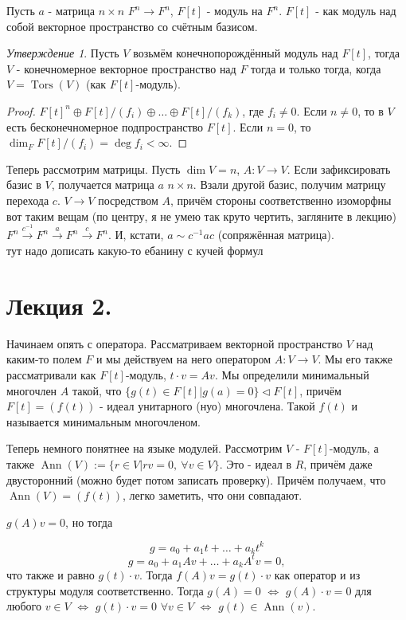 \documentclass[a4paper,100pt]{article}
\theoremstyle{indented}
\theoremstyle{definition}
\theoremstyle{remark}
\newtheorem{stat}{Утверждение}
\DeclareMathOperator{\Tors}{Tors}
\DeclareMathOperator{\Ann}{Ann}
\begin{document}
Пусть $a$ - матрица $n\times n$ $F^n\rightarrow F^n$, $F[t]$ - модуль на $F^n$. $F[t]$ - как модуль над собой векторное пространство со счётным базисом.\ 


\begin{stat}
    Пусть $V$ возьмём конечнопорождённый модуль над $F[t]$, тогда $V$ - конечномерное векторное пространство над $F$ тогда и только тогда, когда $V=\Tors (V)$ (как $F[t]$-модуль).
\end{stat}

\begin{proof}
    $F[t]^n\oplus F[t]/(f_i)\oplus\ldots\oplus F[t]/(f_k)$, где $f_i\neq 0$. Если $n\neq 0$, то в $V$ есть бесконечномерное подпространство $F[t]$. Если $n=0$, то $\dim _F F[t]/(f_i)=\deg f_i < \infty$.
\end{proof}

Теперь рассмотрим матрицы. Пусть $\dim V =n $, $A: V\rightarrow V$. Если зафиксировать базис в $V$, получается матрица $a$ $n\times n$. Взали другой базис, получим матрицу перехода $c$. $V\rightarrow V$ посредством $A$, причём стороны соответственно изоморфны вот таким вещам (по центру, я не умею так круто чертить, загляните в лекцию) $F^n\xrightarrow{c^{-1}}F^n\xrightarrow{a}F^n\xrightarrow{c}F^n$. И, кстати, $a\sim c^{-1}ac$ (сопряжённая матрица).\\

\textsf{тут надо дописать какую-то ебанину с кучей формул}

\section{Лекция 2.}

Начинаем опять с оператора. Рассматриваем векторной пространство $V$ над каким-то полем $F$ и мы действуем на него оператором $A:V\rightarrow V$. Мы его также рассматривали как $F[t]$-модуль, $t\cdot v=Av$. Мы определили минимальный многочлен $A$ такой, что $\{g(t)\in F[t]\vert g(a)=0\}\triangleleft F[t]$, причём $F[t]=(f(t))$ - идеал унитарного (нуо) многочлена. Такой $f(t)$ и называется минимальным многочленом. \
    
Теперь немного понятнее на языке модулей. Рассмотрим $V$ - $F[t]$-модуль, а также $\Ann(V):=\{r\in V\vert rv=0, \: \forall v\in V\}$. Это - идеал в $R$, причём даже двусторонний (можно будет потом записать проверку). Причём получаем, что $\Ann(V)=(f(t))$, легко заметить, что они совпадают.\ 

$g(A)v=0$, но тогда 

\[
    g=a_0+a_1t+\ldots+a_kt^k
\]
\[
    g=a_0+a_1Av+\ldots+a_kA^tv=0,
\]
что также и равно $g(t)\cdot v$. Тогда $f(A)v=g(t)\cdot v$ как оператор и из структуры модуля соответственно. Тогда $g(A)=0$ $\Leftrightarrow$ $g(A)\cdot v=0$ для любого $v\in V$ $\Leftrightarrow$ $g(t)\cdot v=0$ $\forall v\in V$ $\Leftrightarrow$ $g(t)\in \Ann (v)$.\ 
\end{document}
